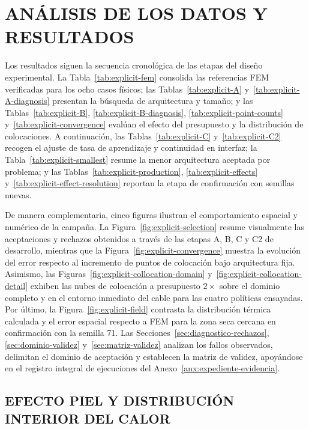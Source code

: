 \section{ANÁLISIS DE LOS DATOS Y RESULTADOS}
\label{sec:analisis-resultados}

Los resultados siguen la secuencia cronológica de las etapas del diseño experimental. La Tabla~\ref{tab:explicit-fem} consolida las referencias FEM verificadas para los ocho casos físicos; las Tablas~\ref{tab:explicit-A} y~\ref{tab:explicit-A-diagnosis} presentan la búsqueda de arquitectura y tamaño; y las Tablas~\ref{tab:explicit-B}, \ref{tab:explicit-B-diagnosis}, \ref{tab:explicit-point-counts} y~\ref{tab:explicit-convergence} evalúan el efecto del presupuesto y la distribución de colocaciones. A continuación, las Tablas~\ref{tab:explicit-C} y~\ref{tab:explicit-C2} recogen el ajuste de tasa de aprendizaje y continuidad en interfaz; la Tabla~\ref{tab:explicit-smallest} resume la menor arquitectura aceptada por problema; y las Tablas~\ref{tab:explicit-production}, \ref{tab:explicit-effects} y~\ref{tab:explicit-effect-resolution} reportan la etapa de confirmación con semillas nuevas.

De manera complementaria, cinco figuras ilustran el comportamiento espacial y numérico de la campaña. La Figura~\ref{fig:explicit-selection} resume visualmente las aceptaciones y rechazos obtenidos a través de las etapas A, B, C y C2 de desarrollo, mientras que la Figura~\ref{fig:explicit-convergence} muestra la evolución del error respecto al incremento de puntos de colocación bajo arquitectura fija. Asimismo, las Figuras~\ref{fig:explicit-collocation-domain} y~\ref{fig:explicit-collocation-detail} exhiben las nubes de colocación a presupuesto $2\times$ sobre el dominio completo y en el entorno inmediato del cable para las cuatro políticas ensayadas. Por último, la Figura~\ref{fig:explicit-field} contrasta la distribución térmica calculada y el error espacial respecto a FEM para la zona seca cercana en confirmación con la semilla 71. Las Secciones~\ref{sec:diagnostico-rechazos}, \ref{sec:dominio-validez} y~\ref{sec:matriz-validez} analizan los fallos observados, delimitan el dominio de aceptación y establecen la matriz de validez, apoyándose en el registro integral de ejecuciones del Anexo~\ref{anx:expediente-evidencia}.



\subsection{EFECTO PIEL Y DISTRIBUCIÓN INTERIOR DEL CALOR}

